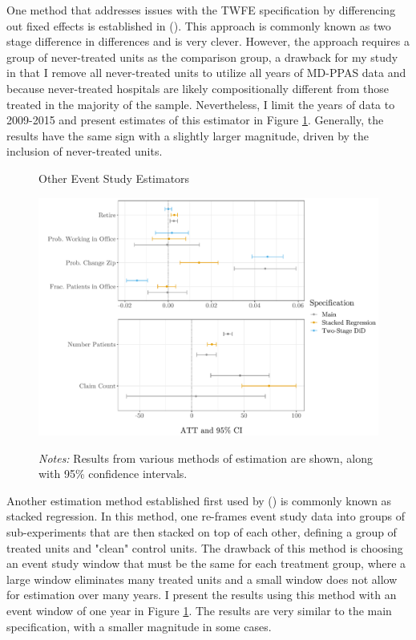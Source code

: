 \documentclass[12pt]{article}
\begin{document}
One method that addresses issues with the TWFE specification by differencing out fixed effects is established in \citeauthor{gardner2021two} (\citeyear{gardner2021two}). This approach is commonly known as two stage difference in differences and is very clever. However, the approach requires a group of never-treated units as the comparison group, a drawback for my study in that I remove all never-treated units to utilize all years of MD-PPAS data and because never-treated hospitals are likely compositionally different from those treated in the majority of the sample. Nevertheless, I limit the years of data to 2009-2015 and present estimates of this estimator in Figure \ref{fig:esimators}. Generally, the results have the same sign with a slightly larger magnitude, driven by the inclusion of never-treated units. 

\begin{figure}[ht]
    \centering
    \captionsetup{width=.57\linewidth}
    \caption{Other Event Study Estimators}
    \includegraphics[scale=.57]{Objects/estimators_graph.pdf}
    \label{fig:esimators}
    \vspace{2mm}
    \caption*{\footnotesize{\textit{Notes:} Results from various methods of estimation are shown, along with 95\% confidence intervals.}}
\end{figure}

Another estimation method established first used by \citeauthor{cengiz2019effect} (\citeyear{cengiz2019effect}) is commonly known as stacked regression. In this method, one re-frames event study data into groups of sub-experiments that are then stacked on top of each other, defining a group of treated units and "clean" control units. The drawback of this method is choosing an event study window that must be the same for each treatment group, where a large window eliminates many treated units and a small window does not allow for estimation over many years. I present the results using this method with an event window of one year in Figure \ref{fig:esimators}. The results are very similar to the main specification, with a smaller magnitude in some cases. 
\end{document}
